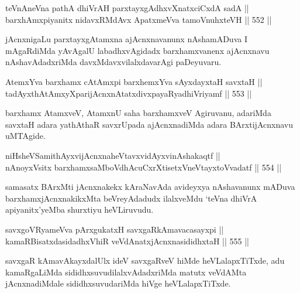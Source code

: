 \begin{shl}
teVnAneVna pathA dhiVrAH parxtayxgAdhxvXnatxciCxdA sadA || \\
barxhAmxpiyanitx nidavxRMdAvx ApatxmeVva tamoVnuhxteVH \hfill || 552 ||  
\end{shl}

\begin{artha}
jAcnxnigaLu parxtayxgAtamxna ajAcnxnavanunx nAshamADuva I mAgaRdiMda
yAvAgalU labadhxvAgidadx barxhamxvanenx ajAcnxnavu nAshavAdadxriMda
davxMdavxvilalxdavarAgi paDeyuvaru.
\end{artha}

\begin{shl}
AtemxYva barxhamx cA\s \s tAmx\s pi barxhemxYva sAyxdayxtaH savxtaH || \\
tadAyxthAtAmxyXparijAcnxnAtatxdivxpayaRyadhiVriyamf \hfill || 553 ||  
\end{shl}

\begin{artha}
barxhamx AtamxveV, AtamxnU saha barxhamxveV Agiruvanu, adariMda
savxtaH adara yathAthaR savxrUpada ajAcnxnadiMda adara BArxtijAcnxnavu
uMTAgide.
\end{artha}

\begin{shl}
niHsheVSamithAyxvijAcnxnaheVtavxvidAyxvinAshakaqtf || \\
nAnoyxV\s sitx barxhamxsaMboVdhAcuCxrXtisetxVneVtayxtoV\s vadatf \hfill || 554 ||  
\end{shl}

\begin{artha}
samasatx BArxMti jAcnxnakekx kAraNavAda avideyxya nAshavanunx mADuva
barxhamxjAcnxnakikxMta beVreyAdadudx ilalxveMdu `teVna dhiVrA
apiyanitx'\-yeMba shurxtiyu heVLiruvudu.
\end{artha}


\begin{shl}
savxgoVR\s yameVva pArxgukatxH savxgaRkAmavacasayxpi || \\
kamaRBisatxdasidadhxVhiR veVdAnatxjAcnxnasididhxtaH \hfill || 555 ||  
\end{shl}

\begin{artha}
savxgaR kAmavAkayxdalUlx ideV savxgaRveV hiMde heVLalapxTiTxde, adu
kamaRgaLiMda sididhxsuvudilalxvAdadxriMda matutx veVdAMta
jAcnxnadiMdale sididhxsuvudariMda hiVge heVLalapxTiTxde.
\end{artha}


